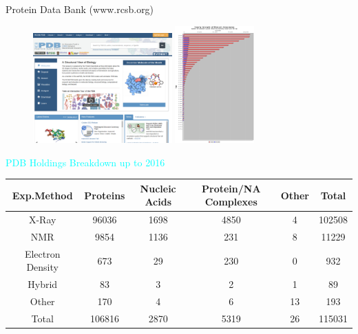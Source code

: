 \documentclass{beamer}
\begin{document}
\begin{frame}{Protein Data Bank (www.rcsb.org)}
          \begin{center}
          \begin{figure}
           \includegraphics[width=2.1in]{../../Lecture_Pictures/RCSB_screen_Shot}
           \includegraphics[width=1.2in]{../../Lecture_Pictures/protein_structures}
          \end{figure}
          \textcolor{cyan}{\small PDB Holdings Breakdown up to 2016}
          {\tiny
          \begin{tabular}{| c | c | c | c | c | c | } \hline
               Exp.Method & Proteins & Nucleic Acids & Protein/NA Complexes & Other & Total \\
               \hline
               X-Ray & 96036 & 1698 & 4850 & 4 & 102508 \\
               NMR & 9854 & 1136 & 231 & 8 & 11229 \\
               Electron Density & 673 & 29 & 230 & 0 & 932 \\
               Hybrid & 83 & 3 & 2 & 1 & 89 \\
               Other & 170 & 4 & 6 & 13 & 193 \\
               Total & 106816 & 2870 & 5319 & 26 & 115031 \\
              \hline
          \end{tabular}
          }
          \end{center}
\end{frame}
\end{document}

